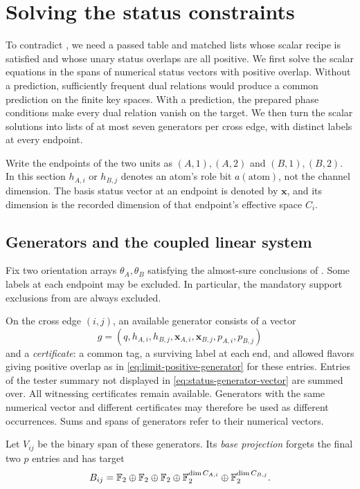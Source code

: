 \section{Solving the status constraints}
\label{sec:status-span}

To contradict , we need a passed table and
matched lists whose scalar recipe is satisfied and whose unary status
overlaps are all positive. We first solve the scalar equations in the
spans of numerical status vectors with positive overlap. Without a
prediction, sufficiently frequent dual relations would produce a
common prediction on the finite key spaces. With a prediction, the
prepared phase conditions make every dual relation vanish on the
target. We then turn the scalar solutions into lists of at most seven
generators per cross edge, with distinct labels at every endpoint.

Write the endpoints of the two units as $(A,1),(A,2)$ and
$(B,1),(B,2)$. In this section $h_{A,i}$ or $h_{B,j}$ denotes an atom's
role bit $a(\mathrm{atom})$, not the channel dimension. The basis status
vector at an endpoint is denoted by $\mathbf x$, and its dimension is
the recorded dimension of that endpoint's effective space $C_i$.

\subsection{Generators and the coupled linear system}

Fix two orientation arrays $\theta_A,\theta_B$ satisfying the
almost-sure conclusions of . Some labels at each
endpoint may be excluded. In particular, the mandatory support
exclusions from  are always excluded.

\begin{definition}
\label{def:status-generator}
On the cross edge $(i,j)$, an available generator consists of a vector
\begin{equation}
\label{eq:status-generator-vector}
g=(q,h_{A,i},h_{B,j},\mathbf x_{A,i},\mathbf x_{B,j},p_{A,i},p_{B,j})
\end{equation}
and a \emph{certificate}: a common tag, a surviving label at each end,
and allowed flavors giving positive overlap as in
\eqref{eq:limit-positive-generator} for these entries. Entries of the
tester summary not displayed in \eqref{eq:status-generator-vector}
are summed over. All witnessing certificates remain available.
Generators with the same numerical vector and different certificates
may therefore be used as different occurrences. Sums and spans of
generators refer to their numerical vectors.

Let $V_{ij}$ be the binary span of these generators. Its \emph{base
projection} forgets the final two $p$ entries and has target
\[
B_{ij}=\mathbb F_2\oplus\mathbb F_2\oplus\mathbb F_2\oplus
             \mathbb F_2^{\dim C_{A,i}}\oplus\mathbb F_2^{\dim C_{B,j}}.
\]
\end{definition}


